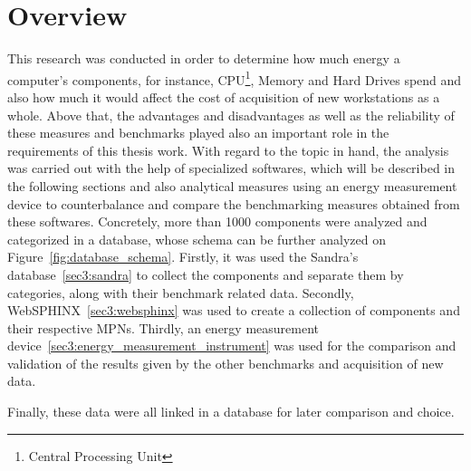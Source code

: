 \section{Overview} \label{sec3:overview}
    This research was conducted in order to determine how much energy a computer's components, for instance, CPU\footnote{Central Processing Unit}, Memory and Hard Drives spend and also how much it would affect the cost of acquisition of new workstations as a whole. Above that, the advantages and disadvantages as well as the reliability of these measures and benchmarks played also an important role in the requirements of this thesis work. With regard to the topic in hand, the analysis was carried out with the help of specialized softwares, which will be described in the following sections and also analytical measures using an energy measurement device to counterbalance and compare the benchmarking measures obtained from these softwares. Concretely, more than 1000 components were analyzed and categorized in a database, whose schema can be further analyzed on Figure~\ref{fig:database_schema}. Firstly, it was used the Sandra's database~\ref{sec3:sandra} to collect the components and separate them by categories, along with their benchmark related data. Secondly, WebSPHINX~\ref{sec3:websphinx} was used to create a collection of components and their respective MPNs. Thirdly, an energy measurement device~\ref{sec3:energy_measurement_instrument} was used for the comparison and validation of the results given by the other benchmarks and acquisition of new data. 

    Finally, these data were all linked in a database for later comparison and choice. 


